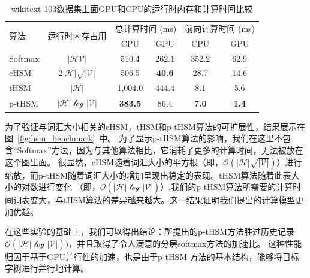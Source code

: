 \begin{table}[!ht]
  \centering
  \caption{wikitext-103数据集上面GPU和CPU的运行时内存和计算时间比较\label{tab:time}}
\begin{tabular}{lccccc}
  \toprule
 \multirow{2}{*}{算法}  &\multirow{2}{*}{运行时内存占用} &\multicolumn{2}{c}{总计算时间 (ms)} & \multicolumn{2}{c}{前向计算时间 (ms)}   \\
   \cmidrule(lr){3-4}  \cmidrule(lr){5-6}
	& & CPU&GPU & CPU& GPU \\ \midrule
Softmax & $\mathcal{|HV|}$ &510.4  &262.1&352.2& 62.9 \\
cHSM    & $2\mathcal{|H|\sqrt{|V|}}$&506.5  &\textbf{40.6}&28.7&14.6 \\
tHSM    &$\mathcal{|H|}$&1,004.0 &444.4 & 8.1&  5.6   \\
p-tHSM  &$\mathcal{|H|\log{|V|}}$ &\textbf{383.5}&	86.4 &\textbf{7.0}&	\textbf{1.4} \\
  \bottomrule
\end{tabular}
\end{table}



为了验证与词汇大小相关的cHSM，tHSM和p-tHSM算法的可扩展性，结果展示在图~\ref{fig:hsm_benchmark}~中。 为了显示p-tHSM算法的影响，我们在这里不包含“Softmax”方法，因为与其他算法相比，它消耗了更多的计算时间，无法被放在这个图里面。 很显然，cHSM随着词汇大小的平方根（即，$ \mathcal{O(| H | \sqrt{| V |})} $）进行缩放，而p-tHSM随着词汇大小的增加呈现出稳定的表现。tHSM算法随着此表大小的对数进行变化 （即，$ \mathcal{O(| H | \log{| V |})} $）,我们的p-tHSM算法所需要的计算时间词表变大，与tHSM算法的差异越来越大。这一结果证明我们提出的计算模型更加优越。


在这些实验的基础上，我们可以得出结论：所提出的p-tHSM方法胜过历史记录$ \mathcal{O(| H | \log| V |)})$，并且取得了令人满意的分层softmax方法的加速比。 这种性能归因于基于GPU并行性的加速，也是由于p-tHSM 方法的基本结构，能够将目标字树进行并行地计算。


